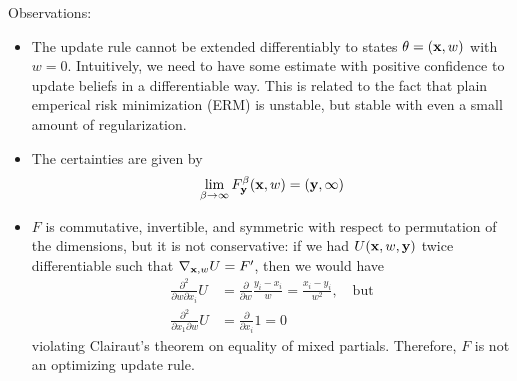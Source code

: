 \begin{example}
	Observations:
	\begin{itemize}
		\item The update rule cannot be extended differentiably to states $\theta = (\mathbf{x}, w)$ with $w = 0$.
			Intuitively, we need to have some estimate with positive confidence to update beliefs in a differentiable way.
			This is related to the fact that plain emperical risk minimization (ERM) is unstable, but stable with even a small amount of regularization.
		\item The certainties are given by
		\[
			\lim_{\beta \to \infty} F^{\beta}_{\mathbf{y}}(\mathbf{x}, w) = (\mathbf{y}, \infty)
		\]
		\item $F$ is commutative, invertible, and symmetric with respect to permutation of the dimensions, but it is not conservative: if we had $U(\mathbf{x}, w, \mathbf{y})$ twice differentiable such that $\nabla_{\mathbf{x}, w} U = F'$, then we would have
        \begin{align*}
        \frac{\partial^2}{\partial w \partial x_i} U &=
			\frac\partial{\partial w} \frac{y_i - x_i}{w} = \frac{x_i - y_i}{w^2},\quad\text{but}
            \\
		\frac{\partial^2}{\partial x_1 \partial w} U
			&= \frac\partial{\partial x_i} 1 = 0    
        \end{align*}
		violating Clairaut's theorem on equality of mixed partials.
		Therefore, $F$ is not an optimizing update rule.
	\end{itemize}
\end{example}


